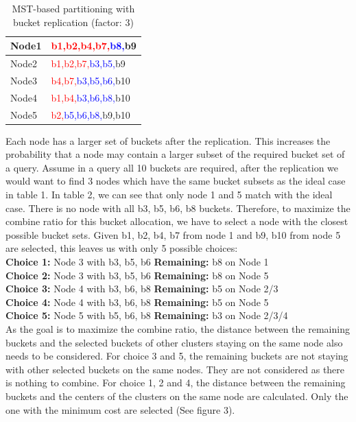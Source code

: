 \documentclass{vldb}
\begin{document}
\begin{table}
\begin{tabular}{|l|l|}
\hline
Node1 & \textcolor{red}{b1,b2,b4,b7,}\textcolor{blue}{b8,}b9\\
\hline
Node2 & \textcolor{red}{b1,b2,b7,}\textcolor{blue}{b3,b5,}b9\\
\hline
Node3 & \textcolor{red}{b4,b7,}\textcolor{blue}{b3,b5,b6,}b10\\
\hline
Node4 & \textcolor{red}{b1,b4,}\textcolor{blue}{b3,b6,b8,}b10\\
\hline
Node5 & \textcolor{red}{b2,}\textcolor{blue}{b5,b6,b8,}b9,b10\\
\hline
\end{tabular}
\center
\caption{MST-based partitioning with bucket replication (factor: 3)}
\center
\end{table}

Each node has a larger set of buckets after the replication. This increases the probability that a node may contain a larger subset of the required bucket set of a query. Assume in a query all 10 buckets are required, after the replication we would want to find 3 nodes which have the same bucket subsets as the ideal case in table 1. In table 2, we can see that only node 1 and 5 match with the ideal case. There is no node with all b3, b5, b6, b8 buckets. Therefore, to maximize the combine ratio for this bucket allocation, we have to select a node with the closest possible bucket sets. Given b1, b2, b4, b7 from node 1 and b9, b10 from node 5 are selected, this leaves us with only 5 possible choices:\\

\indent\indent \textbf{Choice 1:}	Node 3 with b3, b5, b6		\textbf{Remaining:}	b8 on Node 1\\
\indent\indent \textbf{Choice 2:}	Node 3 with b3, b5, b6		\textbf{Remaining:}	b8 on Node 5\\
\indent\indent \textbf{Choice 3:}	Node 4 with b3, b6, b8		\textbf{Remaining:}	b5 on Node 2/3\\
\indent\indent \textbf{Choice 4:}	Node 4 with b3, b6, b8		\textbf{Remaining:}	b5 on Node 5\\
\indent\indent \textbf{Choice 5:}	Node 5 with b5, b6, b8		\textbf{Remaining:}	b3 on Node 2/3/4\\

As the goal is to maximize the combine ratio, the distance between the remaining buckets and the selected buckets of other clusters staying on the same node also needs to be considered. For choice 3 and 5, the remaining buckets are not staying with other selected buckets on the same nodes. They are not considered as there is nothing to combine. For choice 1, 2 and 4, the distance between the remaining buckets and the centers of the clusters on the same node are calculated. Only the one with the minimum cost are selected (See figure 3).
\end{document}
